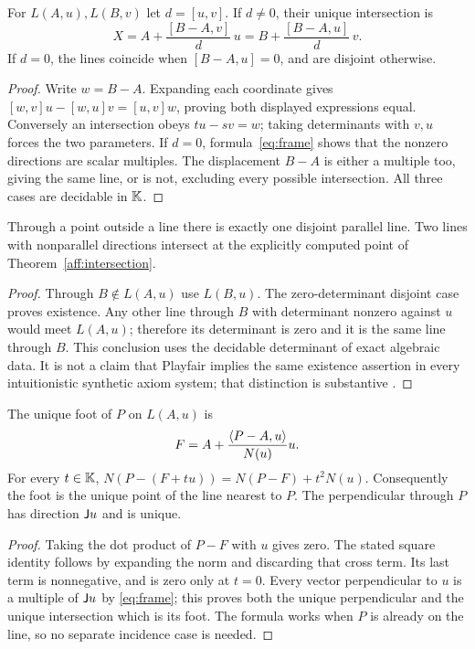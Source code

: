 \begin{theorem}\label{aff:intersection}
For $L(A,u),L(B,v)$ let $d=[u,v]$. If $d\ne0$, their unique intersection is
\[
 X=A+\frac{[B-A,v]}d\,u
   =B+\frac{[B-A,u]}d\,v.
\]
If $d=0$, the lines coincide when $[B-A,u]=0$, and are disjoint otherwise.
\end{theorem}
\begin{proof}
Write $w=B-A$. Expanding each coordinate gives
$[w,v]u-[w,u]v=[u,v]w$, proving both displayed expressions equal.
Conversely an intersection obeys $tu-sv=w$; taking determinants with
$v,u$ forces the two parameters. If $d=0$, formula~\eqref{eq:frame}
shows that the nonzero directions are scalar multiples. The displacement
$B-A$ is either a multiple too, giving the same line, or is not, excluding
every possible intersection. All three cases are decidable in $\mathbb K$.
\end{proof}

\begin{corollary}
\label{aff:parallel}
Through a point outside a line there is exactly one disjoint parallel line.
Two lines with nonparallel directions intersect at the explicitly computed
point of Theorem~\ref{aff:intersection}.
\end{corollary}
\begin{proof}
Through $B\notin L(A,u)$ use $L(B,u)$. The zero-determinant disjoint
case proves existence. Any other line through $B$ with determinant
nonzero against $u$ would meet $L(A,u)$; therefore its determinant is
zero and it is the same line through $B$. This conclusion uses the
decidable determinant of exact algebraic data. It is not a claim that
Playfair implies the same existence assertion in every intuitionistic
synthetic axiom system; that distinction is substantive \cite{beeson}.
\end{proof}

\begin{theorem}\label{aff:foot}
The unique foot of $P$ on $L(A,u)$ is
\[
 F=A+\frac{\langle P-A,u\rangle}{N(u)}u.
\]
For every $t\in\mathbb K$,
$N(P-(F+tu))=N(P-F)+t^2N(u)$.
Consequently the foot is the unique point of the line nearest to $P$.
The perpendicular through $P$ has direction $\mathsf J u$ and is unique.
\end{theorem}
\begin{proof}
Taking the dot product of $P-F$ with $u$ gives zero.
The stated square identity follows by expanding the norm and discarding
that cross term. Its last term is nonnegative, and is zero only at $t=0$.
Every vector perpendicular to $u$ is a multiple of $\mathsf J u$ by
\eqref{eq:frame}; this proves both the unique perpendicular and the unique
intersection which is its foot. The formula works when $P$ is already on
the line, so no separate incidence case is needed.
\end{proof}

